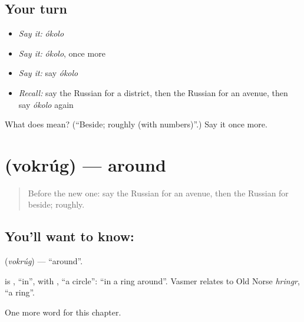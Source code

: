 \subsection*{Your turn}
\begin{itemize}
\raggedright
  \item \emph{Say it:} \emph{ókolo}
  \item \emph{Say it:} \emph{ókolo}, once more
  \item \emph{Say it:} say \emph{ókolo}
  \item \emph{Recall:} say the Russian for a district, then the Russian for an avenue, then say \emph{ókolo} again
\end{itemize}

\begin{tcolorbox}[breakable,colback=teal!4,colframe=teal!35!black,title={Before you move on}]
What does  mean? (\textquotedblleft{}Beside; roughly (with numbers)\textquotedblright{}.) Say it once more.
\end{tcolorbox}
\section[\texorpdfstring{\ru{вокруг} (vokrúg)}{вокруг (vokrúg)}]{ (vokrúg) — around}

\label{lesson:RU-C152-vokrug}



\begin{quote}
Before the new one: say the Russian for an avenue, then the Russian for beside; roughly.
\end{quote}

\subsection*{You'll want to know: }
\textbf{} (\emph{vokrúg}) — \textquotedblleft{}around\textquotedblright{}.

\begin{cousinweb}
\textbf{} is \emph{}, \textquotedblleft{}in\textquotedblright{}, with \emph{}, \textquotedblleft{}a circle\textquotedblright{}: \textquotedblleft{}in a ring around\textquotedblright{}. Vasmer relates \emph{} to Old Norse \emph{hringr}, \textquotedblleft{}a ring\textquotedblright{}.
\end{cousinweb}

\begin{grammarlens}[title={What you've built}]
One more word for this chapter.
\end{grammarlens}

